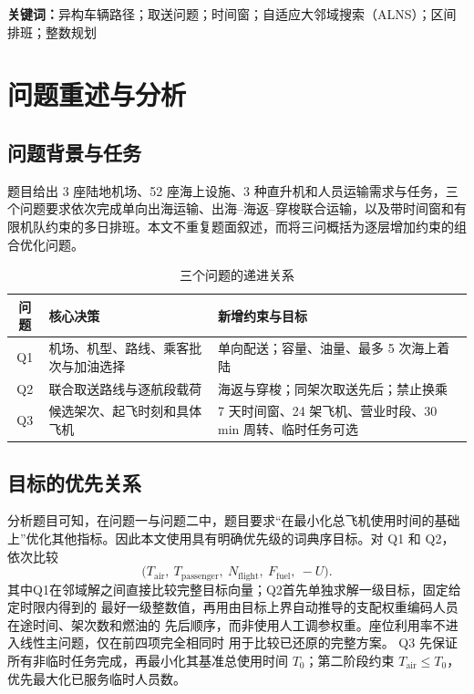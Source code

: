 \documentclass[UTF8,a4paper,zihao=5]{ctexart}
\begin{document}
\noindent\textbf{关键词：}异构车辆路径；取送问题；时间窗；自适应大邻域搜索（ALNS）；区间排班；整数规划

\clearpage
{}

\section{问题重述与分析}

\subsection{问题背景与任务}
题目给出 3 座陆地机场、52 座海上设施、3 种直升机和人员运输需求与任务，三个问题要求依次完成单向出海运输、出海--海返--穿梭联合运输，以及带时间窗和有限机队约束的多日排班。本文不重复题面叙述，而将三问概括为逐层增加约束的组合优化问题。

\begin{table}[htbp]
  \centering
  \caption{三个问题的递进关系}
  \label{tab:question-relation}
  \begin{tabularx}{\linewidth}{c X X}
    \toprule
    问题 & 核心决策 & 新增约束与目标 \\
    \midrule
    Q1 & 机场、机型、路线、乘客批次与加油选择 & 单向配送；容量、油量、最多 5 次海上着陆\\
    Q2 & 联合取送路线与逐航段载荷 & 海返与穿梭；同架次取送先后；禁止换乘\\
    Q3 & 候选架次、起飞时刻和具体飞机 & 7 天时间窗、24 架飞机、营业时段、30 min 周转、临时任务可选 \\
    \bottomrule
  \end{tabularx}
\end{table}

\subsection{目标的优先关系}
分析题目可知，在问题一与问题二中，题目要求“在最小化总飞机使用时间的基础上”优化其他指标。因此本文使用具有明确优先级的词典序目标。对 Q1 和 Q2，依次比较
\begin{equation}
  \bigl(T_{\mathrm{air}},\ T_{\mathrm{passenger}},\ N_{\mathrm{flight}},\
  F_{\mathrm{fuel}},\ -U\bigr).
  \label{eq:lexicographic}
\end{equation}
其中Q1在邻域解之间直接比较完整目标向量；Q2首先单独求解一级目标，固定给定时限内得到的
最好一级整数值，再用由目标上界自动推导的支配权重编码人员在途时间、架次数和燃油的
先后顺序，而非使用人工调参权重。座位利用率不进入线性主问题，仅在前四项完全相同时
用于比较已还原的完整方案。
Q3 先保证所有非临时任务完成，再最小化其基准总使用时间 $T_0$；第二阶段约束 $T_{\mathrm{air}}\le T_0$，优先最大化已服务临时人员数。
\end{document}
